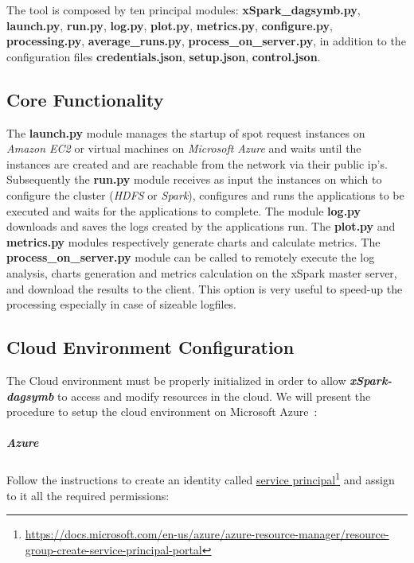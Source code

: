 The tool is composed by ten principal modules:
\textbf{xSpark\_dagsymb.py}, \textbf{launch.py}, \textbf{run.py},
\textbf{log.py}, \textbf{plot.py}, \textbf{metrics.py},
\textbf{configure.py}, \textbf{processing.py},
\textbf{average\_runs.py}, \textbf{process\_on\_server.py}, in addition
to the configuration files \textbf{credentials.json},
\textbf{setup.json}, \textbf{control.json}.

\hypertarget{core-functionality}{%
\subsection{Core Functionality}\label{core-functionality}}

The \textbf{launch.py} module manages the startup of spot request
instances on \emph{Amazon EC2} or virtual machines on \emph{Microsoft
Azure} and waits until the instances are created and are reachable from
the network via their public ip's. Subsequently the \textbf{run.py}
module receives as input the instances on which to configure the cluster
(\emph{HDFS} or \emph{Spark}), configures and runs the applications to
be executed and waits for the applications to complete. The module
\textbf{log.py} downloads and saves the logs created by the applications
run. The \textbf{plot.py} and \textbf{metrics.py} modules respectively
generate charts and calculate metrics. The \textbf{process\_on\_server.py} module can be called to remotely execute the log analysis, charts generation and metrics calculation on the
xSpark master server, and download the results to the client. This
option is very useful to speed-up the processing especially in case of
sizeable logfiles.

\hypertarget{cloud-environment-configuration}{%
\subsection{Cloud Environment
	Configuration}\label{cloud-environment-configuration}}

The Cloud environment must be properly initialized in order to allow
\textbf{\textit{xSpark-dagsymb}} to access and modify resources in the cloud.
We will present the procedure to setup the cloud environment on Microsoft Azure~\cite{Azure}:

\hypertarget{azure}{%
\subparagraph{Azure}\label{azure}}

Follow the instructions to create an identity called
\href{https://docs.microsoft.com/en-us/azure/azure-resource-manager/resource-group-create-service-principal-portal}{service
principal}\footnote{\url{https://docs.microsoft.com/en-us/azure/azure-resource-manager/resource-group-create-service-principal-portal}} and assign to it all the required permissions:

